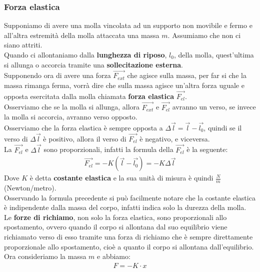         \subsubsection{Forza elastica}
            Supponiamo di avere una molla vincolata ad un supporto non movibile e fermo e all'altra estremità della molla attaccata una massa $m$. Assumiamo che non ci siano attriti.\\
            Quando ci allontaniamo dalla \textbf{lunghezza di riposo}, $l_0$, della molla, quest'ultima si allunga o accorcia tramite una \textbf{sollecitazione esterna}.\\
            Supponendo ora di avere una forza $\vec{F_{ext}}$ che agisce sulla massa, per far si che la massa rimanga ferma, vorrà dire che sulla massa agisce un'altra forza uguale e opposta esercitata dalla molla chiamata \textbf{forza elastica} $\vec{F_{el}}$.\\
            Osserviamo che se la molla si allunga, allora $\vec{F_{ext}}$ e $\vec{F_{el}}$ avranno un verso, se invece la molla si accorcia, avranno verso opposto.\\
            Osserviamo che la forza elastica è sempre opposta a $\Delta\vec{l}=\vec{l}-\vec{l_0}$, quindi se il verso di $\Delta\vec{l}$ è positivo, allora il verso di $\vec{F_{el}}$ è negativo, e viceversa.\\
            La $\vec{F_{el}}$ e $\Delta\vec{l}$ sono proporzionali, infatti la formula della $\vec{F_{el}}$ è la seguente:
            \begin{align*}
                \vec{F_{el}}=-K(\vec{l}-\vec{l_0})=-K\Delta\vec{l}
            \end{align*}
            Dove $K$ è detta \textbf{costante elastica} e la sua unità di misura è quindi $\frac{N}{m}$ (Newton/metro).\\
            Osservando la formula precedente si può facilmente notare che la costante elastica è indipendente dalla massa del corpo, infatti indica solo la durezza della molla.\\
            Le \textbf{forze di richiamo}, non solo la forza elastica, sono proporzionali allo spostamento, ovvero quando il corpo si allontana dal suo equilibrio viene richiamato verso di esso tramite una forza di richiamo che è sempre direttamente proporzionale allo spostamento, cioè a quanto il corpo si allontana dall'equilibrio.\\
            Ora consideriamo la massa $m$ e abbiamo:
            \begin{align*}
                F=-K\cdot x
            \end{align*}
